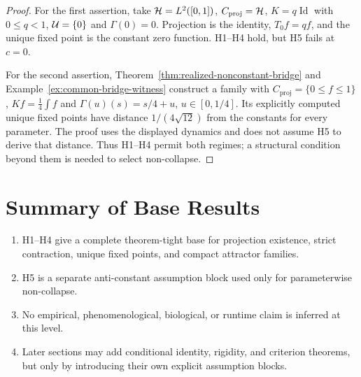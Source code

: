 \begin{proof}
For the first assertion, take $\mathcal{H}=L^2([0,1])$, ${C_{\mathrm{proj}}}=\mathcal{H}$, $K=q\operatorname{Id}$ with $0\leq q<1$, $\mathcal{U}=\{0\}$ and $\Gamma(0)=0$. Projection is the identity, $T_0f=qf$, and the unique fixed point is the constant zero function. H1--H4 hold, but H5 fails at $c=0$.

For the second assertion, Theorem~\ref{thm:realized-nonconstant-bridge} and Example~\ref{ex:common-bridge-witness} construct a family with ${C_{\mathrm{proj}}}=\{0\leq f\leq1\}$, $Kf=\tfrac14\int f$ and $\Gamma(u)(s)=s/4+u$, $u\in[0,1/4]$. Its explicitly computed unique fixed points have distance $1/(4\sqrt{12})$ from the constants for every parameter. The proof uses the displayed dynamics and does not assume H5 to derive that distance. Thus H1--H4 permit both regimes; a structural condition beyond them is needed to select non-collapse.
\end{proof}

\section{Summary of Base Results}

\begin{enumerate}[leftmargin=*]
\item H1--H4 give a complete theorem-tight base for projection existence, strict contraction, unique fixed points, and compact attractor families.
\item H5 is a separate anti-constant assumption block used only for parameterwise non-collapse.
\item No empirical, phenomenological, biological, or runtime claim is inferred at this level.
\item Later sections may add conditional identity, rigidity, and criterion theorems, but only by introducing their own explicit assumption blocks.
\end{enumerate}
